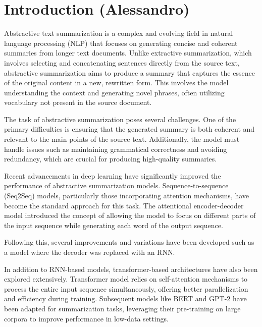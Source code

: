 \section{Introduction (Alessandro)}
Abstractive text summarization is a complex and evolving field in natural language processing (NLP) that focuses on generating concise and coherent summaries from longer text documents. Unlike extractive summarization, which involves selecting and concatenating sentences directly from the source text, abstractive summarization aims to produce a summary that captures the essence of the original content in a new, rewritten form. This involves the model understanding the context and generating novel phrases, often utilizing vocabulary not present in the source document.

The task of abstractive summarization poses several challenges. One of the primary difficulties is ensuring that the generated summary is both coherent and relevant to the main points of the source text. Additionally, the model must handle issues such as maintaining grammatical correctness and avoiding redundancy, which are crucial for producing high-quality summaries.

Recent advancements in deep learning have significantly improved the performance of abstractive summarization models. Sequence-to-sequence (Seq2Seq) models, particularly those incorporating attention mechanisms, have become the standard approach for this task. The attentional encoder-decoder model \cite{bahdanau2014neural} introduced the concept of allowing the model to focus on different parts of the input sequence while generating each word of the output sequence.

Following this, several improvements and variations have been developed such as a model where the decoder was replaced with an RNN\cite{nallapati2016abstractive}. 

In addition to RNN-based models, transformer-based architectures have also been explored extensively. Transformer model \cite{transformer} relies on self-attention mechanisms to process the entire input sequence simultaneously, offering better parallelization and efficiency during training. Subsequent models like BERT \cite{devlin2018bert} and GPT-2 \cite{radford2019language} have been adapted for summarization tasks, leveraging their pre-training on large corpora to improve performance in low-data settings.

